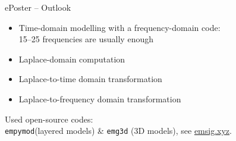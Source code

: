 \documentclass[xcolor=svgnames, usepdftitle=false, aspectratio=169]{beamer}
\newcommand{\emg}[2]{\texttt{emg#1#2}\xspace}
\newcommand{\empymod}{\texttt{empymod}\xspace}
\begin{document}
\begin{frame}
  {ePoster -- Outlook}

  \begin{itemize}\itemsep.5cm
    \item Time-domain modelling with a frequency-domain code:\\
      15--25 frequencies are usually enough
    \item Laplace-domain computation
    \item Laplace-to-time domain transformation
    \item Laplace-to-frequency domain transformation
  \end{itemize}

  \vspace{.5cm}

  Used open-source codes:\\
  \empymod (layered models) \& \emg3d (3D models), see
  \href{https://emsig.xyz}{emsig.xyz}.

\end{frame}
\end{document}
